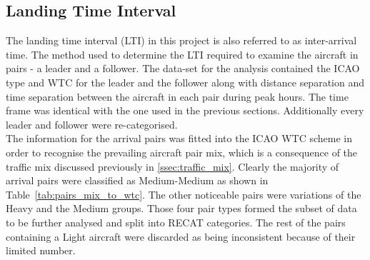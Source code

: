\subsection{Landing Time Interval}\label{ssec:LTI}
The landing time interval (LTI) in this project is also referred to as inter-arrival time. The method used to determine the LTI required to examine the aircraft in pairs - a leader and a follower. The data-set for the analysis contained the ICAO type and WTC for the leader and the follower along with distance separation and time separation between the aircraft in each pair during peak hours. The time frame was identical with the one used in the previous sections. Additionally every leader and follower were re-categorised.\\
The information for the arrival pairs was fitted into the ICAO WTC scheme in order to recognise the prevailing aircraft pair mix, which is a consequence of the traffic mix discussed previously in \ref{ssec:traffic_mix}. Clearly the majority of arrival pairs were classified as Medium-Medium as shown in Table~\ref{tab:pairs_mix_to_wtc}. The other noticeable pairs were variations of the Heavy and the Medium groups. Those four pair types formed the subset of data to be further analysed and split into RECAT categories. The rest of the pairs containing a Light aircraft were discarded as being inconsistent because of their limited number. 
\begin{table}[h]
\centering
{}
\caption[BIKF traffic mix sorted into ICAO WTC]{Number of ICAO pairs from the traffic mix at BIKF arranged into the corresponding wake categories.}
\label{tab:pairs_mix_to_wtc}
\end{table}


